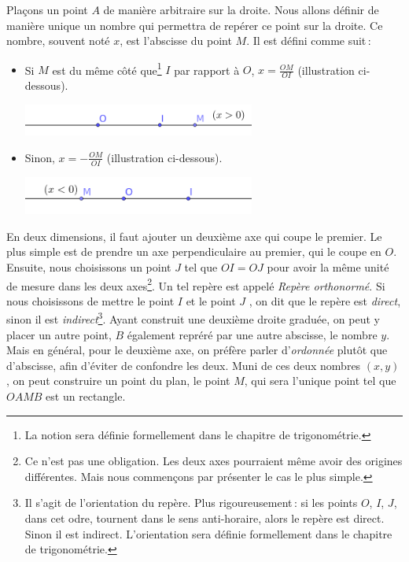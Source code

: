 			Plaçons un point $A$ de manière arbitraire sur la droite. Nous allons définir de manière unique un nombre qui permettra de repérer ce point sur la droite. Ce nombre, souvent noté $x$, est l'abscisse du point $M$. Il est défini comme suit\,:
			\begin{itemize}[$\bullet$]
				\item Si $M$ est du même côté que\footnote{La notion  sera définie formellement dans le chapitre de trigonométrie.} $I$ par rapport à $O$, $x=\frac{OM}{OI}$ (illustration ci-dessous).

				\includegraphics[width=0.6\textwidth]{image/calcul/point1d1.png}
				\item Sinon, $x=-\frac{OM}{OI}$ (illustration ci-dessous). 

				\includegraphics[width=0.6\textwidth]{image/calcul/point1d2.png}
			\end{itemize}



			En deux dimensions, il faut ajouter un deuxième axe qui coupe le premier. Le plus simple est de prendre un axe perpendiculaire au premier, qui le coupe en $O$. Ensuite, nous choisissons un point $J$ tel que $OI=OJ$ pour avoir la même unité de mesure dans les deux axes\footnote{Ce n'est pas une obligation. Les deux axes pourraient même avoir des origines différentes. Mais nous commençons par présenter le cas le plus simple.}. Un tel repère est appelé \emph{Repère orthonormé}. Si nous choisissons de mettre le point $I$  et le point $J$ , on dit que le repère est \emph{direct}, sinon il est \emph{indirect}\footnote{Il s'agit de l'orientation du repère. Plus rigoureusement\,: si les points $O$, $I$, $J$, dans cet odre, tournent dans le sens anti-horaire, alors le repère est direct. Sinon il est indirect. L'orientation sera définie formellement dans le chapitre de trigonométrie.}. Ayant construit une deuxième droite graduée, on peut y placer un autre point, $B$ également repréré par une autre abscisse, le nombre $y$. Mais en général, pour le deuxième axe, on préfère parler d'\emph{ordonnée} plutôt que d'abscisse, afin d'éviter de confondre les deux. 
			Muni de ces deux nombres $(x,y)$, on peut construire un point du plan, le point $M$, qui sera l'unique point tel que $OAMB$ est un rectangle. 

